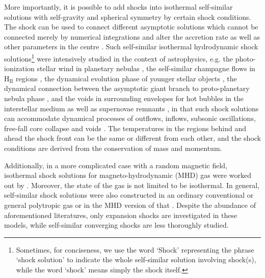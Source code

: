 \documentclass[fleqn,usenatbib]{mnras}
\begin{document}
More importantly, it is possible to add shocks into isothermal self-similar solutions with self-gravity and spherical symmetry by certain shock conditions. The shock can be used to connect different asymptotic solutions which cannot be connected merely by numerical integrations and alter the accretion rate as well as other parameters in the centre \citep{tsai1995protostellar}. Such self-similar isothermal hydrodynamic shock solutions\footnote{Sometimes, for conciseness, we use the word `Shock' representing the phrase `shock solution' to indicate the whole self-similar solution involving shock(s), while the word `shock' means simply the shock itself.} were intensively studied in the context of astrophysics, e.g. the photo-ionization stellar wind in planetary nebulas \citep{chevalier1997expansion}, the self-similar champagne flows in $\mathrm{H_{II}}$ regions \citep{shu2002self}, the dynamical evolution phase of younger stellar objects \citep{shen2004shocked}, the dynamical connection between the asymptotic giant branch to proto-planetary nebula phase \citep{bian2005spherical}, and the voids in surrounding envelopes for hot bubbles in the interstellar medium as well as supernovae remnants \citep{lou2009dynamic}, in that such shock solutions can accommodate dynamical processes of outflows, inflows, subsonic oscillations, free-fall core collapse and voids \citep{bian2005spherical, lou2009dynamic}. The temperatures in the regions behind and ahead the shock front can be the same or different from each other, and the shock conditions are derived from the conservation of mass and momentum. 

Additionally, in a more complicated case with a random magnetic field, isothermal shock solutions for magneto-hydrodynamic (MHD) gas were worked out by \citet{yuLou2006}. Moreover, the state of the gas is not limited to be isothermal. In general, self-similar shock solutions were also constructed in an ordinary conventional or general polytropic gas \citep{lou2006self, lou2006new, lou2012dynamic, hu2008self, lou2008self} or in the MHD version of that \citep{wang2008dynamic, lou2010general}. Despite the abundance of aforementioned literatures, only expansion shocks are investigated in these models, while self-similar converging shocks are less thoroughly studied.
\end{document}
